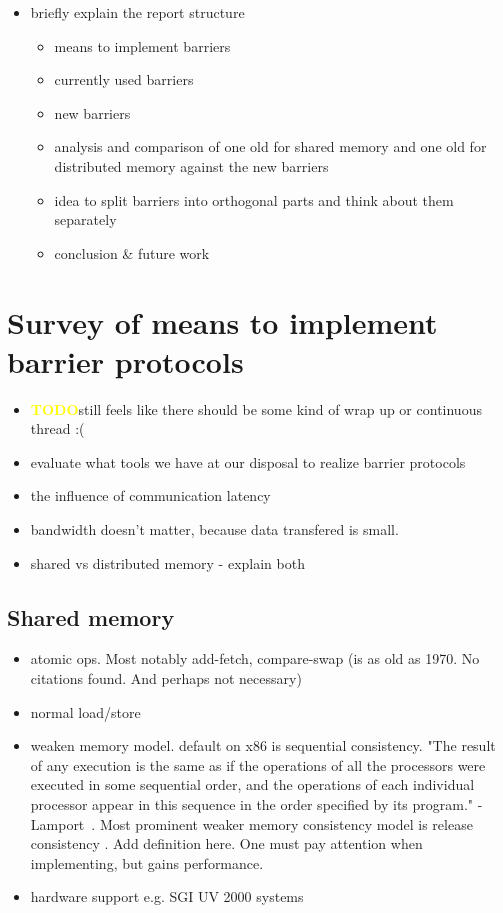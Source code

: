 \documentclass[a4paper, 10pt]{article}
\def \todo{\textbf{\textcolor{yellow}{TODO}}}
\begin{document}
\begin{itemize}
	\item briefly explain the report structure
		\begin{itemize}
			\item means to implement barriers
			\item currently used barriers
			\item new barriers
			\item analysis and comparison of one old for shared memory and one old for distributed memory against the new barriers
			\item idea to split barriers into orthogonal parts and think about them separately
			\item conclusion \& future work
		\end{itemize}
\end{itemize}


\section{Survey of means to implement barrier protocols}
\begin{itemize}
	\item \todo still feels like there should be some kind of wrap up or continuous thread :(
	\item evaluate what tools we have at our disposal to realize barrier protocols
	\item the influence of communication latency
	\item bandwidth doesn't matter, because data transfered is small.
	\item shared vs distributed memory - explain both
\end{itemize}

\subsection{Shared memory}
\begin{itemize}
	\item atomic ops. Most notably add-fetch, compare-swap (is as old as 1970. No citations found. And perhaps not necessary)
	\item normal load/store
	\item weaken memory model. default on x86 is sequential consistency. "The result of any execution is the same as if the operations of all the processors were executed in some sequential order, and the operations of each individual processor appear in this sequence in the order specified by its program." - Lamport~\cite{sequentialconsistency}. Most prominent weaker memory consistency model is release consistency \cite{gha90}. Add definition here. One must pay attention when implementing, but gains performance.
	\item hardware support e.g. SGI UV 2000 systems\cite{sgiuv2000}
\end{itemize}
\end{document}
